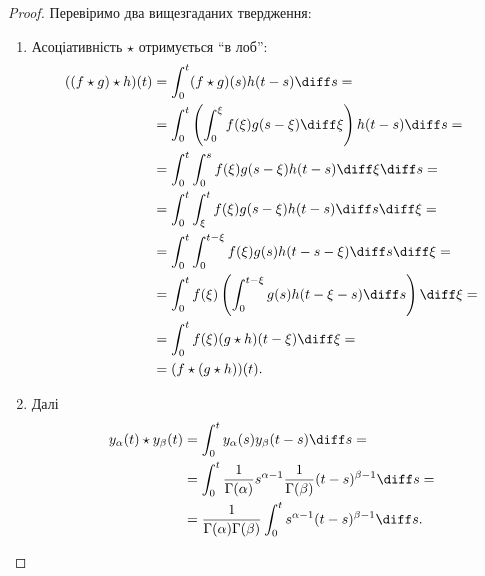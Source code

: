 \begin{proof}
    Перевіримо два вищезгаданих твердження:
    \begin{enumerate}
        \item Асоціативність $\star$ отримується ``в лоб'':
        \begin{equation}
            \begin{aligned}
                ((f \star g) \star h)(t) &=
                \int_0^t (f \star g)(s) h(t - s) \diff s = \\
                &= \int_0^t \left( \int_0^\xi f(\xi) g(s - \xi) \diff \xi \right) h(t - s) \diff s = \\
                &= \int_0^t \int_0^s f(\xi) g(s - \xi) h(t - s) \diff \xi \diff s = \\
                &= \int_0^t \int_\xi^t f(\xi) g(s - \xi) h(t - s) \diff s \diff \xi = \\
                &= \int_0^t \int_0^{t - \xi} f(\xi) g(s) h(t - s - \xi) \diff s \diff \xi = \\
                &= \int_0^t f(\xi) \left( \int_0^{t - \xi} g(s) h(t - \xi - s) \diff s \right) \diff \xi = \\
                &= \int_0^t f(\xi) (g \star h)(t - \xi) \diff \xi = \\
                &= (f \star (g \star h))(t).
            \end{aligned}
        \end{equation}
        \item Далі
        \begin{equation}
            \begin{aligned}
                y_\alpha(t) \star y_\beta(t) 
                &= \int_0^t y_\alpha(s) y_\beta(t - s) \diff s = \\
                &= \int_0^t \frac{1}{\Gamma(\alpha)} s^{\alpha - 1} \frac{1}{\Gamma(\beta)} (t - s)^{\beta - 1} \diff s = \\
                &= \frac{1}{\Gamma(\alpha) \Gamma(\beta)} \int_0^t s^{\alpha - 1} (t - s)^{\beta - 1} \diff s.
            \end{aligned}
        \end{equation}
        

\end{enumerate}
\end{proof}
